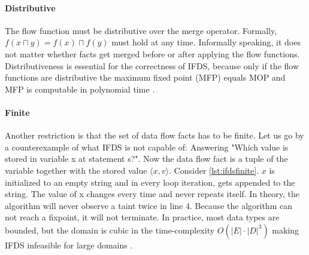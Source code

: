 \documentclass[../draft.tex]{subfiles}
\begin{document}
    \paragraph{Distributive} The flow function must be distributive over the merge operator. 
    Formally, $f(x \sqcap y) = f(x) \sqcap f(y)$ must hold at any time. 
    Informally speaking, it does not matter whether facts get merged before or after applying the flow functions. 
    Distributiveness is essential for the correctness of IFDS, because only if the flow functions are distributive the maximum fixed point (MFP) equals MOP and MFP is computable in polynomial time \cite{Khedker2009,Reps1995}.

    \paragraph{Finite} Another restriction is that the set of data flow facts has to be finite. 
    Let us go by a counterexample of what IFDS is not capable of: Answering "Which value is stored in variable x at statement s?".
    Now the data flow fact is a tuple of the variable together with the stored value $\langle x, v \rangle$. 
    Consider \autoref{lst:ifdsfinite}. 
    $x$ is initialized to an empty string and in every loop iteration,  gets appended to the string. 
    The value of x changes every time and never repeats itself. 
    In theory, the algorithm will never observe a taint twice in line 4. 
    Because the algorithm can not reach a fixpoint, it will not terminate. 
    In practice, most data types are bounded, but the domain is cubic in the time-complexity $O(|E| \cdot |D|^3)$ making IFDS infeasible for large domains \cite{Reps1995}.
\end{document}
